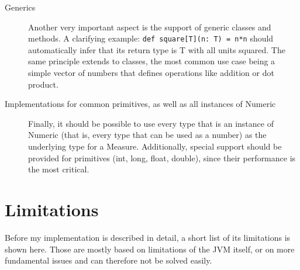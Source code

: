 \documentclass[12pt,oneside,a4paper]{scrbook}
\begin{document}
\begin{description}
  \item[Generics] Another very important aspect is the support of generic classes and methods. A clarifying example: \verb|def square[T](n: T) = n*n| should automatically infer that its return type is T with all units squared. The same principle extends to classes, the most common use case being a simple vector of numbers that defines operations like addition or dot product.

  \item[Implementations for common primitives, as well as all instances of Numeric] Finally, it should be possible to use every type that is an instance of Numeric (that is, every type that can be used as a number) as the underlying type for a Measure. Additionally, special support should be provided for primitives (int, long, float, double), since their performance is the most critical.

\end{description}

\section{Limitations}
\label{sec:limitiations}

Before my implementation is described in detail, a short list of its limitations is shown here. Those are mostly based on limitations of the JVM itself, or on more fundamental issues and can therefore not be solved easily.
\end{document}
